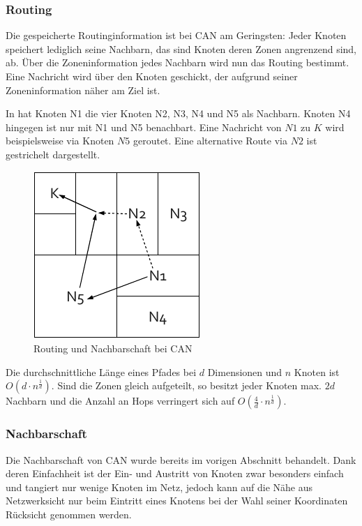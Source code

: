 \subsubsection{Routing} 
Die gespeicherte Routinginformation ist bei CAN am Geringsten: Jeder Knoten speichert lediglich seine Nachbarn, das sind Knoten deren Zonen angrenzend sind, ab. Über die Zoneninformation jedes Nachbarn wird nun das Routing bestimmt. Eine Nachricht wird über den Knoten geschickt, der aufgrund seiner Zoneninformation näher am Ziel ist.

In  hat Knoten N1 die vier Knoten N2, N3, N4 und N5 als Nachbarn. Knoten N4 hingegen ist nur mit N1 und N5 benachbart. Eine Nachricht von $N1$ zu $K$ wird beispielsweise via Knoten $N5$ geroutet. Eine alternative Route via $N2$ ist gestrichelt dargestellt.

\begin{figure}[htbp]
\centering
\includegraphics{grafics/can_routing.pdf}
\caption{Routing und Nachbarschaft bei CAN}
\label{fig:can_routing}
\end{figure}

Die durchschnittliche Länge eines Pfades bei $d$ Dimensionen und $n$ Knoten ist $O(d\cdot n^\frac{1}{d})$. Sind die Zonen gleich aufgeteilt, so besitzt jeder Knoten max. $2d$ Nachbarn und die Anzahl an Hops verringert sich auf $O(\frac{4}{d}\cdot n^\frac{1}{d})$.

\subsubsection{Nachbarschaft}
Die Nachbarschaft von CAN wurde bereits im vorigen Abschnitt behandelt. Dank deren Einfachheit ist der Ein- und Austritt von Knoten zwar besonders einfach und tangiert nur wenige Knoten im Netz, jedoch kann auf die Nähe aus Netzwerksicht nur beim Eintritt eines Knotens bei der Wahl seiner Koordinaten Rücksicht genommen werden.


